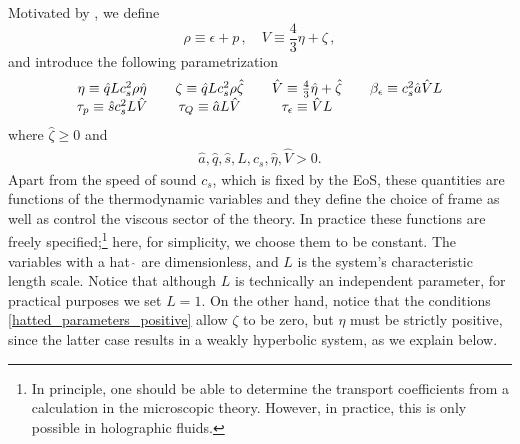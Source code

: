 \documentclass[prd,aps,twocolumn,floats,floatfix,nofootinbib,superscriptaddress] {revtex4-1}
\begin{document}
Motivated by \cite{Pandya:2022sff}, we define
\begin{equation}
    \rho\equiv\epsilon+p\,,\quad V\equiv\frac{4}{3}\eta+\zeta\,,
\end{equation}
and introduce the following parametrization 
\begin{align}
\begin{array}
[c]{ccccccc}
\eta\equiv\hat{q} 
Lc_{s}^{2}\rho\hat{\eta}
&  &
\zeta\equiv\hat{q}  
Lc_{s}^{2}\rho\hat{\zeta}
&  &
\hat{V}\equiv\frac{4}{3}\hat{\eta}+\hat{\zeta} &  & \beta_{\epsilon}\equiv
c_{s}^{2}\hat{a} 
\hat{V}L
\\
\tau_{p}\equiv\hat{s}c_{s}^{2}
L\hat{V}
&  &
\tau_{Q}\equiv\hat{a}
L\hat{V}
&  & \tau_{\epsilon
}\equiv
\hat{V}L
&  &
\label{hatted_parameters}
\end{array}
\end{align}
where $\hat{\zeta}\geq0$ and 
\begin{align}
\hat{a},\hat{q},\hat{s},L,c_{s},
\hat{\eta},\hat{V}>0. \label{hatted_parameters_positive}
\end{align} 
% 
Apart from the speed of sound $c_s$, which is fixed by the EoS, these quantities are functions of the thermodynamic variables and they define the choice of frame as well as control the viscous sector of the theory.  In practice these functions are freely specified;\footnote{In principle, one should be able to determine the transport coefficients from a calculation in the microscopic theory.  However, in practice, this is only possible in holographic fluids.} here, for simplicity, we choose them to be constant. The variables with a hat $\hat\,$ are dimensionless, and $L$ is the system's characteristic length scale.
Notice that although $L$ is technically an independent parameter, for practical purposes we set $L=1$. 
On the other hand, notice that the conditions \eqref{hatted_parameters_positive} allow $\zeta$ to be zero, but $\eta$ must be strictly positive, since the latter case results in a weakly hyperbolic system, as we explain below. 
\end{document}
